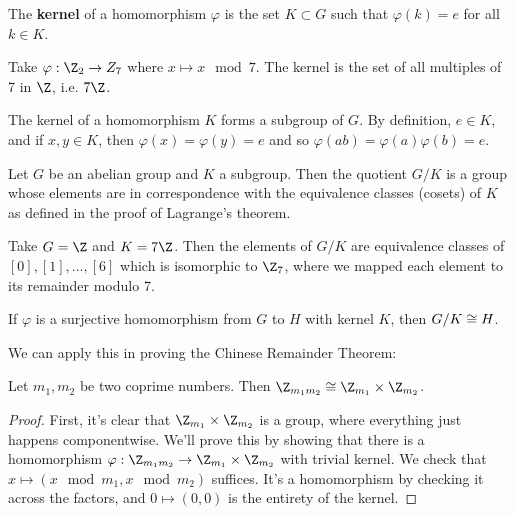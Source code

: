 \begin{definition}
	The \textbf{kernel} of a homomorphism $\varphi$ is the set $K\subset G$ such that $\varphi(k)=e$ for all $k\in K$.
\end{definition}

\begin{example}
	Take $\varphi:\Z_2\rightarrow Z_7$ where $x\mapsto  x{\mod{7}}$.  The kernel is the set of all multiples of 7 in  $\Z$, i.e. $7\Z$.
\end{example}

\begin{lemma}
	{The kernel of a homomorphism $K$ forms a subgroup of $G$.}  By definition, $e\in K$, and if $x,y\in K$, then $\varphi(x)=\varphi(y)=e$ and so $\varphi(ab) = \varphi(a)\varphi(b)=e$.
\end{lemma}

\begin{definition}
Let $G$ be an abelian group and $K$ a subgroup. Then the quotient $G/K$ is a group whose elements are in correspondence with the equivalence classes (cosets) of $K$ as defined in the proof of Lagrange's theorem.
\end{definition}


\begin{example}
	Take $G=\Z$ and $K=7\Z$. Then the elements of $G/K$ are equivalence classes of $[0],[1],\dots,[6]$ which is isomorphic to $\Z_7$, where we mapped each element to its remainder modulo 7.
\end{example}

\begin{theorem}
	If $\varphi$ is a surjective homomorphism from $G$ to $H$ with kernel $K$, then $G/K \cong H$.
\end{theorem}

We can apply this in proving the Chinese Remainder Theorem:

\begin{theorem}
	Let $m_1,m_2$ be two coprime numbers. Then $\Z_{m_1m_2}\iso \Z_{m_1}\times \Z_{m_2}$.
\end{theorem}


\begin{proof}
	First, it's clear that  $\Z_{m_1}\times \Z_{m_2}$ is a group, where everything just happens componentwise.  We'll prove this by showing that there is a homomorphism  $\varphi: \Z_{m_1m_2}\rightarrow \Z_{m_1}\times \Z_{m_2}$ with trivial kernel.  We check that $x\mapsto(x\mod{m_1},x\mod{m_2})$ suffices.  It's a homomorphism by checking it across the factors, and $0\mapsto(0,0)$ is the entirety of the kernel.
\end{proof}

